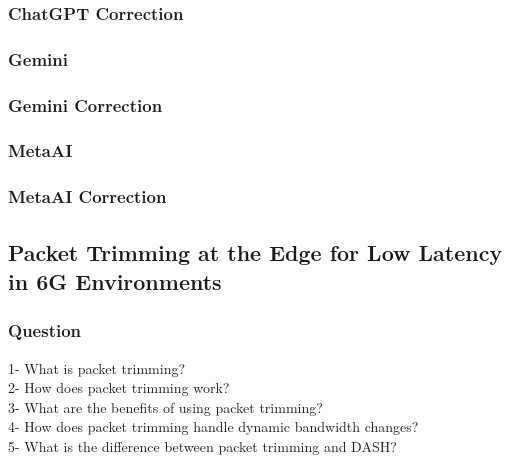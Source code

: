 \subsubsection{ChatGPT Correction}
\begin{tcolorbox}[breakable]
    
\end{tcolorbox}
\subsubsection{Gemini}
\begin{tcolorbox}[breakable]
    
\end{tcolorbox}
\subsubsection{Gemini Correction}
\begin{tcolorbox}[breakable]
    
\end{tcolorbox}
\subsubsection{MetaAI}
\begin{tcolorbox}[breakable]
    
\end{tcolorbox}
\subsubsection{MetaAI Correction}
\begin{tcolorbox}[breakable]
    
\end{tcolorbox}


\subsection{Packet Trimming at the Edge for Low Latency in 6G Environments}
\subsubsection{Question}
\begin{tcolorbox}[breakable]
    1- What is packet trimming?\\
2- How does packet trimming work?\\
3- What are the benefits of using packet trimming?\\
4- How does packet trimming handle dynamic bandwidth changes?\\
5- What is the difference between packet trimming and DASH?\\

\end{tcolorbox}
